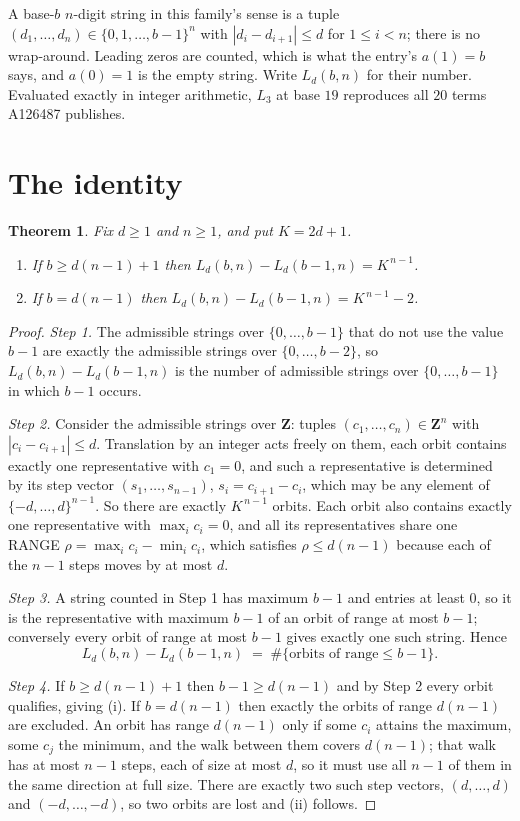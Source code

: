 \documentclass[11pt,a4paper]{article}
\theoremstyle{plain}
\newtheorem{theorem}{Theorem}
\theoremstyle{definition}
\begin{document}
A base-$b$ $n$-digit string in this family's sense is a tuple
$(d_1,\dots,d_n)\in\{0,1,\dots,b-1\}^{n}$ with $|d_i-d_{i+1}|\le d$ for $1\le i<n$; there
is no wrap-around. Leading zeros are counted, which is what the entry's $a(1)=b$ says, and
$a(0)=1$ is the empty string. Write $L_d(b,n)$ for their number. Evaluated exactly in integer
arithmetic, $L_{3}$ at base $19$ reproduces all $20$ terms A126487 publishes.

\section{The identity}

\begin{theorem}
Fix $d\ge1$ and $n\ge1$, and put $K=2d+1$.
\begin{enumerate}
\item[(i)] If $b\ge d(n-1)+1$ then $L_d(b,n)-L_d(b-1,n)=K^{\,n-1}$.
\item[(ii)] If $b=d(n-1)$ then $L_d(b,n)-L_d(b-1,n)=K^{\,n-1}-2$.
\end{enumerate}
\end{theorem}

\begin{proof}
\emph{Step 1.} The admissible strings over $\{0,\dots,b-1\}$ that do not use the value $b-1$
are exactly the admissible strings over $\{0,\dots,b-2\}$, so $L_d(b,n)-L_d(b-1,n)$ is the
number of admissible strings over $\{0,\dots,b-1\}$ in which $b-1$ occurs.

\emph{Step 2.} Consider the admissible strings over $\mathbf{Z}$: tuples
$(c_1,\dots,c_n)\in\mathbf{Z}^{n}$ with $|c_i-c_{i+1}|\le d$. Translation by an integer acts
freely on them, each orbit contains exactly one representative with $c_1=0$, and such a
representative is determined by its step vector $(s_1,\dots,s_{n-1})$, $s_i=c_{i+1}-c_i$,
which may be any element of $\{-d,\dots,d\}^{n-1}$. So there are exactly $K^{\,n-1}$ orbits.
Each orbit also contains exactly one representative with $\max_i c_i=0$, and all its
representatives share one RANGE $\rho=\max_ic_i-\min_ic_i$, which satisfies
$\rho\le d(n-1)$ because each of the $n-1$ steps moves by at most $d$.

\emph{Step 3.} A string counted in Step 1 has maximum $b-1$ and entries at least $0$, so it is
the representative with maximum $b-1$ of an orbit of range at most $b-1$; conversely every orbit
of range at most $b-1$ gives exactly one such string. Hence
\[
L_d(b,n)-L_d(b-1,n)\;=\;\#\{\text{orbits of range}\le b-1\} .
\]

\emph{Step 4.} If $b\ge d(n-1)+1$ then $b-1\ge d(n-1)$ and by Step 2 every orbit qualifies,
giving (i). If $b=d(n-1)$ then exactly the orbits of range $d(n-1)$ are excluded. An orbit has
range $d(n-1)$ only if some $c_i$ attains the maximum, some $c_j$ the minimum, and the walk
between them covers $d(n-1)$; that walk has at most $n-1$ steps, each of size at most $d$, so it
must use all $n-1$ of them in the same direction at full size. There are exactly two such step
vectors, $(d,\dots,d)$ and $(-d,\dots,-d)$, so two orbits are lost and (ii) follows.
\end{proof}
\end{document}
